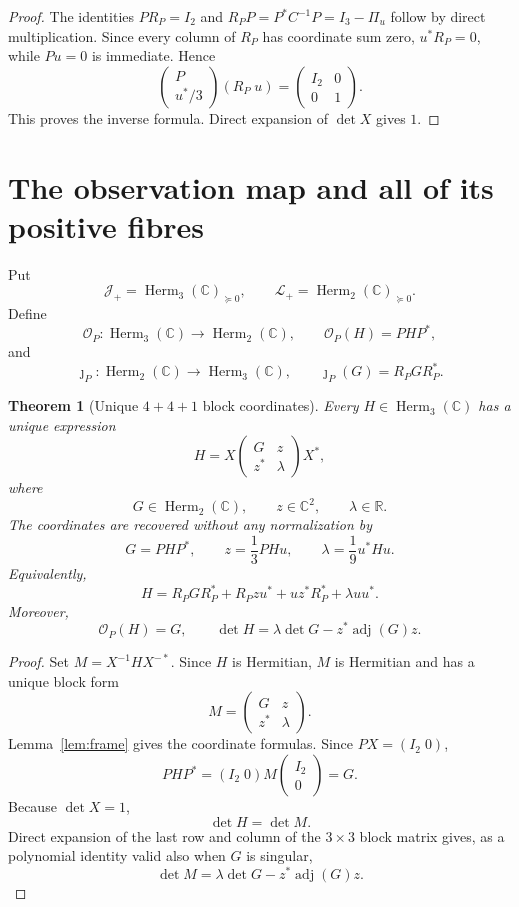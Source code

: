 \documentclass[11pt]{article}
\newtheorem{theorem}{Theorem}[section]
\theoremstyle{definition}
\newcommand{\C}{\mathbb C}
\newcommand{\R}{\mathbb R}
\newcommand{\Herm}{\operatorname{Herm}}
\newcommand{\adj}{\operatorname{adj}}
\newcommand{\Jp}{\mathcal J_+}
\newcommand{\Lp}{\mathcal L_+}
\begin{document}
\begin{proof}
The identities $PR_P=I_2$ and $R_PP=P^*C^{-1}P=I_3-\Pi_u$ follow by direct multiplication.  Since every column of $R_P$ has coordinate sum zero, $u^*R_P=0$, while $Pu=0$ is immediate.  Hence
\[
 \begin{pmatrix}P\\u^*/3\end{pmatrix}(R_P\;u)
 =\begin{pmatrix}I_2&0\\0&1\end{pmatrix}.
\]
This proves the inverse formula.  Direct expansion of $\det X$ gives $1$.
\end{proof}

\section{The observation map and all of its positive fibres}

Put
\[
 \Jp=\Herm_3(\C)_{\succeq0},
 \qquad
 \Lp=\Herm_2(\C)_{\succeq0}.
\]
Define
\[
 \mathcal O_P:\Herm_3(\C)\longrightarrow\Herm_2(\C),
 \qquad
 \mathcal O_P(H)=PHP^*,
\]
and
\[
 \jmath_P:\Herm_2(\C)\longrightarrow\Herm_3(\C),
 \qquad
 \jmath_P(G)=R_PGR_P^*.
\]

\begin{theorem}[Unique $4+4+1$ block coordinates]\label{thm:block-coordinates}
Every $H\in\Herm_3(\C)$ has a unique expression
\[
 \boxed{
 H=X\begin{pmatrix}G&z\\z^*&\lambda\end{pmatrix}X^*,}
\]
where
\[
 G\in\Herm_2(\C),\qquad z\in\C^2,\qquad \lambda\in\R.
\]
The coordinates are recovered without any normalization by
\[
 \boxed{
 G=PHP^*,\qquad z=\frac13PHu,\qquad
 \lambda=\frac19u^*Hu.}
\]
Equivalently,
\[
 H=R_PGR_P^*+R_Pzu^*+uz^*R_P^*+\lambda uu^*.
\]
Moreover,
\[
 \boxed{\mathcal O_P(H)=G,}
 \qquad
 \boxed{\det H=\lambda\det G-z^*\adj(G)z.}
\]
\end{theorem}

\begin{proof}
Set $M=X^{-1}HX^{-*}$.  Since $H$ is Hermitian, $M$ is Hermitian and has a unique block form
\[
 M=\begin{pmatrix}G&z\\z^*&\lambda\end{pmatrix}.
\]
Lemma~\ref{lem:frame} gives the coordinate formulas.  Since $PX=(I_2\;0)$,
\[
 PHP^*=(I_2\;0)M\begin{pmatrix}I_2\\0\end{pmatrix}=G.
\]
Because $\det X=1$,
\[
 \det H=\det M.
\]
Direct expansion of the last row and column of the $3\times3$ block matrix gives, as a polynomial identity valid also when $G$ is singular,
\[
 \det M=\lambda\det G-z^*\adj(G)z.
\]
\end{proof}
\end{document}

